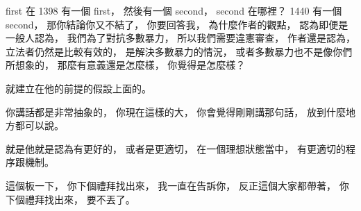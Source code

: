 \hypertarget{w06:cue:3152}{}first 在 1398 有一個 first，
\hypertarget{w06:cue:3153}{}然後有一個 second，
\hypertarget{w06:cue:3154}{}second 在哪裡？
\hypertarget{w06:cue:3155}{}1440 有一個 second，
\hypertarget{w06:cue:3156}{}那你結論你又不結了，
\hypertarget{w06:cue:3157}{}你要回答我，
\hypertarget{w06:cue:3158}{}為什麼作者的觀點，
\hypertarget{w06:cue:3159}{}認為即便是一般人認為，
\hypertarget{w06:cue:3160}{}我們為了對抗多數暴力，
\hypertarget{w06:cue:3161}{}所以我們需要違憲審查，
\hypertarget{w06:cue:3162}{}作者還是認為，
\hypertarget{w06:cue:3163}{}立法者仍然是比較有效的，
\hypertarget{w06:cue:3164}{}是解決多數暴力的情況，
\hypertarget{w06:cue:3165}{}或者多數暴力也不是像你們所想象的，
\hypertarget{w06:cue:3166}{}那麼有意義還是怎麼樣，
\hypertarget{w06:cue:3167}{}你覺得是怎麼樣？

\hypertarget{w06:cue:3168}{}就建立在他的前提的假設上面的。

\hypertarget{w06:cue:3169}{}你講話都是非常抽象的，
\hypertarget{w06:cue:3170}{}你現在這樣的大，
\hypertarget{w06:cue:3171}{}你會覺得剛剛講那句話，
\hypertarget{w06:cue:3172}{}放到什麼地方都可以說。

\hypertarget{w06:cue:3173}{}就是他就是認為有更好的，
\hypertarget{w06:cue:3174}{}或者是更適切，
\hypertarget{w06:cue:3175}{}在一個理想狀態當中，
\hypertarget{w06:cue:3176}{}有更適切的程序跟機制。

\hypertarget{w06:cue:3177}{}這個板一下，
\hypertarget{w06:cue:3178}{}你下個禮拜找出來，
\hypertarget{w06:cue:3179}{}我一直在告訴你，
\hypertarget{w06:cue:3180}{}反正這個大家都帶著，
\hypertarget{w06:cue:3181}{}你下個禮拜找出來，
\hypertarget{w06:cue:3182}{}要不丟了。

